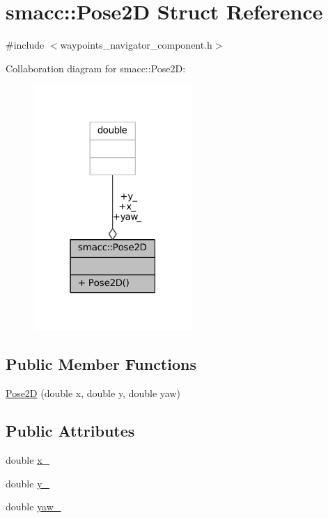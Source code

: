 \hypertarget{structsmacc_1_1Pose2D}{}\section{smacc\+:\+:Pose2D Struct Reference}
\label{structsmacc_1_1Pose2D}


{\ttfamily \#include $<$waypoints\+\_\+navigator\+\_\+component.\+h$>$}



Collaboration diagram for smacc\+:\+:Pose2D\+:
\nopagebreak
\begin{figure}[H]
\begin{center}
\leavevmode
\includegraphics[width=171pt]{structsmacc_1_1Pose2D__coll__graph}
\end{center}
\end{figure}
\subsection*{Public Member Functions}
\begin{DoxyCompactItemize}
\item 
\hyperlink{structsmacc_1_1Pose2D_aa1e66bf9e0aaeccc866b030af445df76}{Pose2D} (double x, double y, double yaw)
\end{DoxyCompactItemize}
\subsection*{Public Attributes}
\begin{DoxyCompactItemize}
\item 
double \hyperlink{structsmacc_1_1Pose2D_a8f876eecc29329305779a9fbe5e827bb}{x\+\_\+}
\item 
double \hyperlink{structsmacc_1_1Pose2D_a29508b823676c1591fb5969858f1193a}{y\+\_\+}
\item 
double \hyperlink{structsmacc_1_1Pose2D_a79f207f922e6eed40846e6443456f7ba}{yaw\+\_\+}
\end{DoxyCompactItemize}


